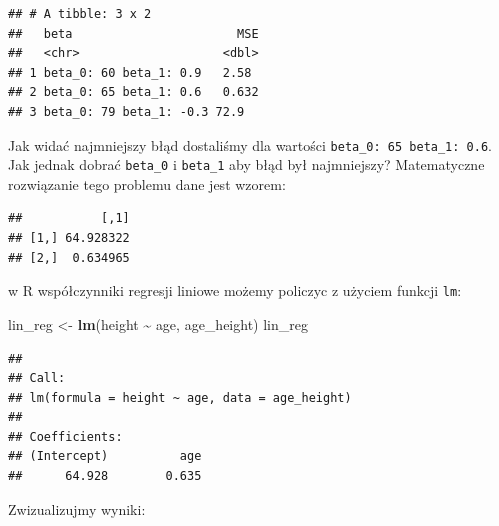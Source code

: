 \documentclass[
]{article}
\newenvironment{Shaded}{\begin{snugshade}}{\end{snugshade}}
\newcommand{\DecValTok}[1]{\textcolor[rgb]{0.00,0.00,0.81}{#1}}
\newcommand{\KeywordTok}[1]{\textcolor[rgb]{0.13,0.29,0.53}{\textbf{#1}}}
\newcommand{\NormalTok}[1]{#1}
\newcommand{\OperatorTok}[1]{\textcolor[rgb]{0.81,0.36,0.00}{\textbf{#1}}}
\newcommand{\StringTok}[1]{\textcolor[rgb]{0.31,0.60,0.02}{#1}}
\begin{document}
\begin{verbatim}
## # A tibble: 3 x 2
##   beta                       MSE
##   <chr>                    <dbl>
## 1 beta_0: 60 beta_1: 0.9   2.58 
## 2 beta_0: 65 beta_1: 0.6   0.632
## 3 beta_0: 79 beta_1: -0.3 72.9
\end{verbatim}

Jak widać najmniejszy błąd dostaliśmy dla wartości
\texttt{beta\_0:\ 65\ beta\_1:\ 0.6}. Jak jednak dobrać \texttt{beta\_0}
i \texttt{beta\_1} aby błąd był najmniejszy? Matematyczne rozwiązanie
tego problemu dane jest wzorem:

\begin{Shaded}
\end{Shaded}

\begin{verbatim}
##           [,1]
## [1,] 64.928322
## [2,]  0.634965
\end{verbatim}

w R współczynniki regresji liniowe możemy policzyc z użyciem funkcji
\texttt{lm}:

\begin{Shaded}
\begin{Highlighting}[]
\NormalTok{lin\_reg \textless{}{-}}\StringTok{ }\KeywordTok{lm}\NormalTok{(height }\OperatorTok{\textasciitilde{}}\StringTok{ }\NormalTok{age, age\_height)}
\NormalTok{lin\_reg}
\end{Highlighting}
\end{Shaded}

\begin{verbatim}
## 
## Call:
## lm(formula = height ~ age, data = age_height)
## 
## Coefficients:
## (Intercept)          age  
##      64.928        0.635
\end{verbatim}

Zwizualizujmy wyniki:
\end{document}
